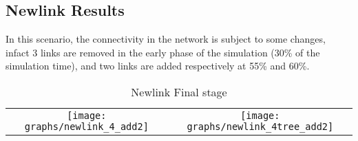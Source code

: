 \documentclass{article}
\begin{document}
	\subsection{Newlink Results}
In this scenario, the connectivity in the network is subject to some changes, infact 3 links are removed in the early phase of the simulation (30\% of the simulation time), and two links are added respectively at 55\% and 60\%.

		\begin{table}[H]
			\centering
			\begin{tabular}{cc}
				\texttt{[image: graphs/newlink\_4\_add2]}&\texttt{[image: graphs/newlink\_4tree\_add2]}\\
			\end{tabular}
			\caption{Newlink Final stage}
			\label{tab:comparisonNewlink}
		\end{table}
		
\end{document}

